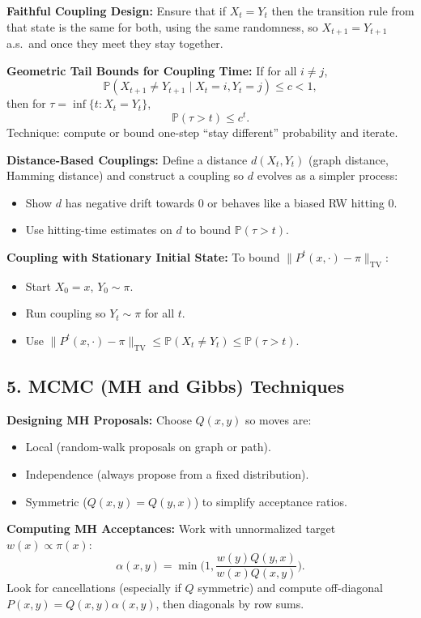 \documentclass[answers,12pt,addpoints]{exam}
\begin{document}
\textbf{Faithful Coupling Design:}
Ensure that if $X_t=Y_t$ then the transition rule from that state is the same for both, using the same randomness, so $X_{t+1}=Y_{t+1}$ a.s.\ and once they meet they stay together.

\textbf{Geometric Tail Bounds for Coupling Time:}
If for all $i\neq j$,
\[
\mathbb{P}(X_{t+1}\neq Y_{t+1}\mid X_t=i,Y_t=j)\le c<1,
\]
then for $\tau=\inf\{t:X_t=Y_t\}$,
\[
\mathbb{P}(\tau>t)\le c^t.
\]
Technique: compute or bound one-step “stay different” probability and iterate.

\textbf{Distance-Based Couplings:}
Define a distance $d(X_t,Y_t)$ (graph distance, Hamming distance) and construct a coupling so $d$ evolves as a simpler process:
\begin{itemize}
\item Show $d$ has negative drift towards $0$ or behaves like a biased RW hitting $0$.
\item Use hitting-time estimates on $d$ to bound $\mathbb{P}(\tau>t)$.
\end{itemize}

\textbf{Coupling with Stationary Initial State:}
To bound $\|P^t(x,\cdot)-\pi\|_{\mathrm{TV}}$:
\begin{itemize}
\item Start $X_0=x$, $Y_0\sim\pi$.
\item Run coupling so $Y_t\sim\pi$ for all $t$.
\item Use $\|P^t(x,\cdot)-\pi\|_{\mathrm{TV}}\le \mathbb{P}(X_t\neq Y_t)\le \mathbb{P}(\tau>t)$.
\end{itemize}

\subsection*{5. MCMC (MH and Gibbs) Techniques}

\textbf{Designing MH Proposals:}
Choose $Q(x,y)$ so moves are:
\begin{itemize}
\item Local (random-walk proposals on graph or path).
\item Independence (always propose from a fixed distribution).
\item Symmetric ($Q(x,y)=Q(y,x)$) to simplify acceptance ratios.
\end{itemize}

\textbf{Computing MH Acceptances:}
Work with unnormalized target $w(x)\propto\pi(x)$:
\[
\alpha(x,y)=\min\Big(1,\frac{w(y)Q(y,x)}{w(x)Q(x,y)}\Big).
\]
Look for cancellations (especially if $Q$ symmetric) and compute off-diagonal $P(x,y)=Q(x,y)\alpha(x,y)$, then diagonals by row sums.
\end{document}
